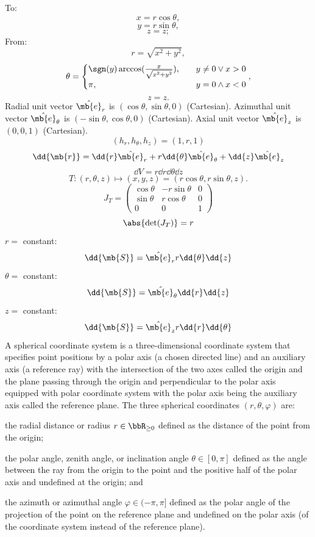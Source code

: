 To:
\[x=r\cos\theta,\]
\[y=r\sin\theta,\]
\[z=z;\]
From:
\[r=\sqrt{x^2+y^2},\]
\[\theta=\begin{cases}\sgn(y)\arccos(\frac{x}{\sqrt{x^2+y^2}}),\quad&y\neq 0\lor x>0\\\pi,\quad&y=0\land x<0\end{cases},\]
\[z=z.\]
Radial unit vector $\hat{\mb{e}}_r$ is $(\cos\theta,\sin\theta,0)$ (Cartesian). Azimuthal unit vector $\hat{\mb{e}}_{\theta}$ is $(-\sin\theta,\cos\theta,0)$ (Cartesian). Axial unit vector $\hat{\mb{e}}_z$ is $(0,0,1)$ (Cartesian).
\[(h_r,h_{\theta},h_z)=(1,r,1)\]
\[\dd{\mb{r}}=\dd{r}\hat{\mb{e}}_r+r\dd{\theta}\hat{\mb{e}}_{\theta}+\dd{z}\hat{\mb{e}}_z\]
\[\dd{V}=r\dd{r}\dd{\theta}\dd{z}\]
\bpr
\[T\colon(r,\theta,z)\mapsto(x,y,z)=(r\cos\theta,r\sin\theta,z).\]
\[J_T=\begin{pmatrix}
\cos\theta & -r\sin\theta & 0\\
\sin\theta & r \cos\theta & 0\\
0 & 0 & 1
\end{pmatrix}\]
\[\abs{\det(J_T)}=r\]
\epr
{}
$r=$ constant:
\[\dd{\mb{S}}=\hat{\mb{e}}_rr\dd{\theta}\dd{z}\]
$\theta=$ constant:
\[\dd{\mb{S}}=\hat{\mb{e}}_{\theta}\dd{r}\dd{z}\]
$z=$ constant:
\[\dd{\mb{S}}=\hat{\mb{e}}_zr\dd{r}\dd{\theta}\]
A spherical coordinate system is a three-dimensional coordinate system that specifies point positions by a polar axis (a chosen directed line) and an auxiliary axis (a reference ray) with the intersection of the two axes called the origin and the plane passing through the origin and perpendicular to the polar axis equipped with polar coordinate system with the polar axis being the auxiliary axis called the reference plane. The three spherical coordinates $(r,\theta,\varphi)$ are:
\bit
\item the radial distance or radius $r\in\bbR_{\geq 0}$ defined as the distance of the point from the origin;
\item the polar angle, zenith angle, or inclination angle $\theta\in[0,\pi]$ defined as the angle between the ray from the origin to the point and the positive half of the polar axis and undefined at the origin; and
\item the azimuth or azimuthal angle $\varphi\in(-\pi,\pi]$ defined as the polar angle of the projection of the point on the reference plane and undefined on the polar axis (of the coordinate system instead of the reference plane).
